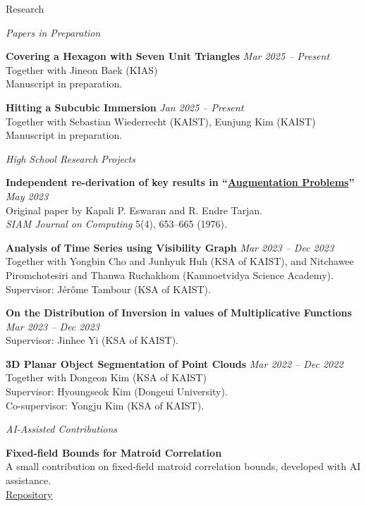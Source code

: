 \documentclass{resume}
\begin{document}
\begin{rSection}{Research}

\textit{Papers in Preparation}\nopagebreak

\textbf{Covering a Hexagon with Seven Unit Triangles} \hfill \textit{Mar 2025 -- Present}\\
Together with Jineon Baek (KIAS)\\
Manuscript in preparation.

\textbf{Hitting a Subcubic Immersion} \hfill \textit{Jan 2025 -- Present}\\
Together with Sebastian Wiederrecht (KAIST), Eunjung Kim (KAIST)\\
Manuscript in preparation.

\textit{High School Research Projects}\nopagebreak

\textbf{Independent re-derivation of key results in ``\href{https://doi.org/10.1137/0205044}{Augmentation Problems}''} \hfill \textit{May 2023}\\
Original paper by Kapali P. Eswaran and R. Endre Tarjan.\\
\textit{SIAM Journal on Computing} 5(4), 653--665 (1976).

\textbf{Analysis of Time Series using Visibility Graph} \hfill \textit{Mar 2023 -- Dec 2023}\\
Together with Yongbin Cho and Junhyuk Huh (KSA of KAIST), and Nitchawee Piromchotesiri and Thanwa Ruchakhom (Kamnoetvidya Science Academy).\\
Supervisor: Jérôme Tambour (KSA of KAIST).

\textbf{On the Distribution of Inversion in values of Multiplicative Functions} \hfill \textit{Mar 2023 -- Dec 2023}\\
Supervisor: Jinhee Yi (KSA of KAIST).

\textbf{3D Planar Object Segmentation of Point Clouds} \hfill \textit{Mar 2022 -- Dec 2022}\\
Together with Dongeon Kim (KSA of KAIST)\\
Supervisor: Hyoungseok Kim (Dongeui University).\\
Co-supervisor: Yongju Kim (KSA of KAIST).

\textit{AI-Assisted Contributions}\nopagebreak

\textbf{Fixed-field Bounds for Matroid Correlation}\\
A small contribution on fixed-field matroid correlation bounds, developed with AI assistance.\\
\href{https://github.com/dylan0301/Punctured-projective-block-affine-fibre-matroids}{Repository}

\end{rSection}
\end{document}
